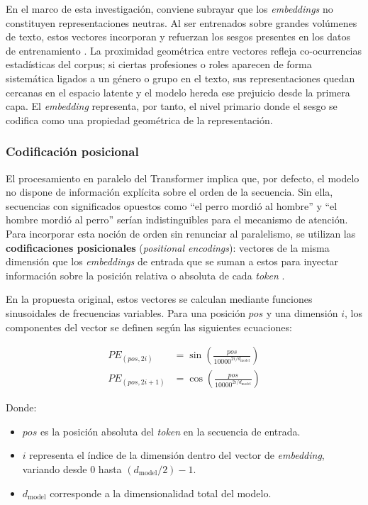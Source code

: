 \documentclass[12pt,a4paper]{report}
\begin{document}
En el marco de esta investigación, conviene subrayar que los \textit{embeddings} no constituyen representaciones neutras. Al ser entrenados sobre grandes volúmenes de texto, estos vectores incorporan y refuerzan los sesgos presentes en los datos de entrenamiento \cite{bolukbasi_man_2016}. La proximidad geométrica entre vectores refleja co-ocurrencias estadísticas del corpus; si ciertas profesiones o roles aparecen de forma sistemática ligados a un género o grupo en el texto, sus representaciones quedan cercanas en el espacio latente y el modelo hereda ese prejuicio desde la primera capa. El \textit{embedding} representa, por tanto, el nivel primario donde el sesgo se codifica como una propiedad geométrica de la representación.

\subsubsection{Codificación posicional}
\label{subsubsec:positional_encodings}

El procesamiento en paralelo del Transformer implica que, por defecto, el modelo no dispone de información explícita sobre el orden de la secuencia. Sin ella, secuencias con significados opuestos como ``el perro mordió al hombre'' y ``el hombre mordió al perro'' serían indistinguibles para el mecanismo de atención. Para incorporar esta noción de orden sin renunciar al paralelismo, se utilizan las \textbf{codificaciones posicionales} (\textit{positional encodings}): vectores de la misma dimensión que los \textit{embeddings} de entrada que se suman a estos para inyectar información sobre la posición relativa o absoluta de cada \textit{token} \cite{vaswani_attention_2017}.

En la propuesta original, estos vectores se calculan mediante funciones sinusoidales de frecuencias variables. Para una posición $pos$ y una dimensión $i$, los componentes del vector se definen según las siguientes ecuaciones:

\begin{align}
PE_{(pos, 2i)} &= \sin\left(\frac{pos}{10000^{2i/d_{\mathrm{model}}}}\right) \\[0.8em]
PE_{(pos, 2i+1)} &= \cos\left(\frac{pos}{10000^{2i/d_{\mathrm{model}}}}\right)
\end{align}

Donde:
\begin{itemize}
    \item $pos$ es la posición absoluta del \textit{token} en la secuencia de entrada.
    \item $i$ representa el índice de la dimensión dentro del vector de \textit{embedding}, variando desde $0$ hasta $(d_{\mathrm{model}}/2) - 1$.
    \item $d_{\mathrm{model}}$ corresponde a la dimensionalidad total del modelo.
\end{itemize}
\end{document}
